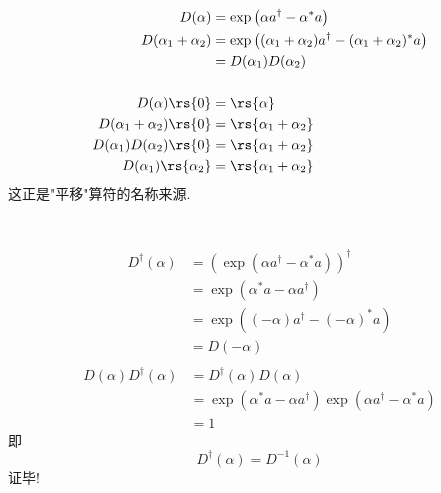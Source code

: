  \begin{frame}
    \frametitle{}
    \例 [3. 试证明平移算符有如下性质 ]{
        \[ D (\alpha_1) \rs{\alpha_2}= \rs{\alpha_1+ \alpha_2} \] 
    }
    \证 
  \[ 
    \begin{aligned}
        D(\alpha) &=\exp \left(\alpha a^{\dagger}-\alpha^{*} a\right) \\
        D (\alpha_1+ \alpha_2) &= \exp \left((\alpha_1+ \alpha_2) a^{\dagger}-(\alpha_1+\alpha_2)^{*} a\right) \\
        &= D (\alpha_1) D(\alpha_2) \\
        & ~ \\
        D (\alpha) \rs{0} &= \rs{\alpha} \\
        D (\alpha_1+ \alpha_2) \rs{0} &= \rs{\alpha_1+ \alpha_2} \\
        D (\alpha_1) D(\alpha_2)\rs{0} &= \rs{\alpha_1+ \alpha_2} \\
        D (\alpha_1) \rs{\alpha_2} &= \rs{\alpha_1+ \alpha_2} \\
  \end{aligned}  
  \] 
  这正是"平移"算符的名称来源.
\end{frame}
 
 \begin{frame}
       \frametitle{} 
       \例 [4. 试证明位移算符是幺正算符 ]{}
       \证 ~
    \[ 
    \begin{aligned}
        D^\dagger (\alpha) &= (\exp \left(\alpha a^{\dagger}-\alpha^{*} a\right) )^\dagger \\
        &= \exp \left(\alpha^* a-\alpha a^\dagger \right)  \\
        &= \exp \left( (-\alpha) a^\dagger- (-\alpha)^* a \right)  \\
        &= D (-\alpha)  \\
    \end{aligned}  
    \]  
    \[ 
    \begin{aligned}
        D (\alpha)D^\dagger (\alpha) &= D^\dagger (\alpha)D (\alpha) \\
        &= \exp \left(\alpha^* a-\alpha a^\dagger \right) \exp \left(\alpha a^{\dagger}-\alpha^{*} a\right)  \\
        &=1
    \end{aligned}  
    \]  
    即
    \[   D^\dagger (\alpha)= D^{-1} (\alpha)  \]
    证毕!
\end{frame}

